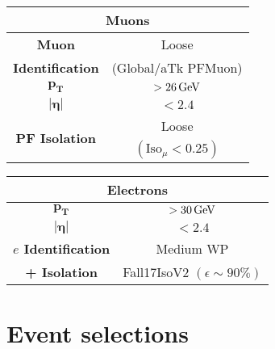 \begin{minipage}{\linewidth}
    \vspace{-0.5cm}
    \begin{minipage}{0.47\linewidth}
        \begin{table}[H]
        \centering
        \begin{tabular}{c|c}
            \toprule
            \multicolumn{2}{c}{\textbf{Muons}}\\
            \midrule
            \midrule
            \textbf{Muon} & Loose\\
            \textbf{Identification}& (Global/aTk PFMuon)\\
            \midrule
            $\mathbf{p_T}$& $>26 {\,\text{Ge\hspace{-.08em}V}}$\\
            \midrule
            $\bm{|\eta|}$& $<2.4$ \\
            \midrule
            \multirow{2}{*}{\textbf{PF Isolation}}&Loose\\
            &$(\text{Iso}_\mu<0.25)$\\
            \bottomrule
        \end{tabular}
    \end{table}
        
    \end{minipage}
    \hfill
    \begin{minipage}{0.47\linewidth}
        \begin{table}[H]
            \centering
            \renewcommand{\arraystretch}{1.48}
            \begin{tabular}{c|c}
                \toprule
                \multicolumn{2}{c}{\textbf{Electrons}}\\
                \midrule
                \midrule
                $\mathbf{p_T}$& $>30 {\,\text{Ge\hspace{-.08em}V}}$\\
                \midrule
                $\bm{|\eta|}$& $<2.4$ \\
                \midrule
                \textbf{$e$ Identification}&Medium WP\\
                \textbf{+ Isolation}&Fall17IsoV2 $(\epsilon \sim 90\%)$\\
                \bottomrule
            \end{tabular}
        \end{table}      
    \end{minipage}
\end{minipage}





\section{Event selections}
